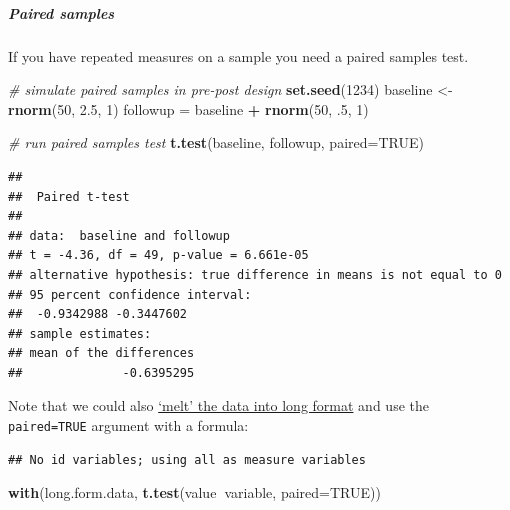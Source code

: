 \documentclass[]{article}
\newenvironment{Shaded}{\begin{snugshade}}{\end{snugshade}}
\newcommand{\KeywordTok}[1]{\textcolor[rgb]{0.13,0.29,0.53}{\textbf{#1}}}
\newcommand{\DataTypeTok}[1]{\textcolor[rgb]{0.13,0.29,0.53}{#1}}
\newcommand{\DecValTok}[1]{\textcolor[rgb]{0.00,0.00,0.81}{#1}}
\newcommand{\FloatTok}[1]{\textcolor[rgb]{0.00,0.00,0.81}{#1}}
\newcommand{\StringTok}[1]{\textcolor[rgb]{0.31,0.60,0.02}{#1}}
\newcommand{\CommentTok}[1]{\textcolor[rgb]{0.56,0.35,0.01}{\textit{#1}}}
\newcommand{\OtherTok}[1]{\textcolor[rgb]{0.56,0.35,0.01}{#1}}
\newcommand{\OperatorTok}[1]{\textcolor[rgb]{0.81,0.36,0.00}{\textbf{#1}}}
\newcommand{\NormalTok}[1]{#1}
\let\oldsubparagraph\subparagraph
\renewcommand{\subparagraph}[1]{\oldsubparagraph{#1}\mbox{}}
\theoremstyle{definition}
\theoremstyle{definition}
\theoremstyle{definition}
\theoremstyle{remark}
\begin{document}
\subparagraph{Paired samples}\label{paired-samples}

If you have repeated measures on a sample you need a paired samples
test.

\begin{Shaded}
\begin{Highlighting}[]
\CommentTok{# simulate paired samples in pre-post design}
\KeywordTok{set.seed}\NormalTok{(}\DecValTok{1234}\NormalTok{)}
\NormalTok{baseline <-}\StringTok{ }\KeywordTok{rnorm}\NormalTok{(}\DecValTok{50}\NormalTok{, }\FloatTok{2.5}\NormalTok{, }\DecValTok{1}\NormalTok{)}
\NormalTok{followup =}\StringTok{ }\NormalTok{baseline }\OperatorTok{+}\StringTok{ }\KeywordTok{rnorm}\NormalTok{(}\DecValTok{50}\NormalTok{, .}\DecValTok{5}\NormalTok{, }\DecValTok{1}\NormalTok{)}

\CommentTok{# run paired samples test}
\KeywordTok{t.test}\NormalTok{(baseline, followup, }\DataTypeTok{paired=}\OtherTok{TRUE}\NormalTok{)}
\end{Highlighting}
\end{Shaded}

\begin{verbatim}
## 
##  Paired t-test
## 
## data:  baseline and followup
## t = -4.36, df = 49, p-value = 6.661e-05
## alternative hypothesis: true difference in means is not equal to 0
## 95 percent confidence interval:
##  -0.9342988 -0.3447602
## sample estimates:
## mean of the differences 
##              -0.6395295
\end{verbatim}

Note that we could also \protect\hyperlink{wide-to-long}{`melt' the data
into long format} and use the \texttt{paired=TRUE} argument with a
formula:

\begin{Shaded}
\end{Shaded}

\begin{verbatim}
## No id variables; using all as measure variables
\end{verbatim}

\begin{Shaded}
\begin{Highlighting}[]
\KeywordTok{with}\NormalTok{(long.form.data, }\KeywordTok{t.test}\NormalTok{(value}\OperatorTok{~}\NormalTok{variable, }\DataTypeTok{paired=}\OtherTok{TRUE}\NormalTok{))}
\end{Highlighting}
\end{Shaded}
\end{document}
